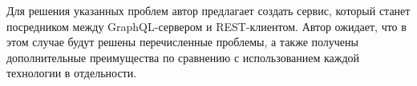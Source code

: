 Для решения указанных проблем автор предлагает создать сервис, который станет посредником между GraphQL-сервером и REST-клиентом.
Автор ожидает, что в этом случае будут решены перечисленные проблемы, а также получены дополнительные преимущества по сравнению с использованием каждой технологии в отдельности.


%

